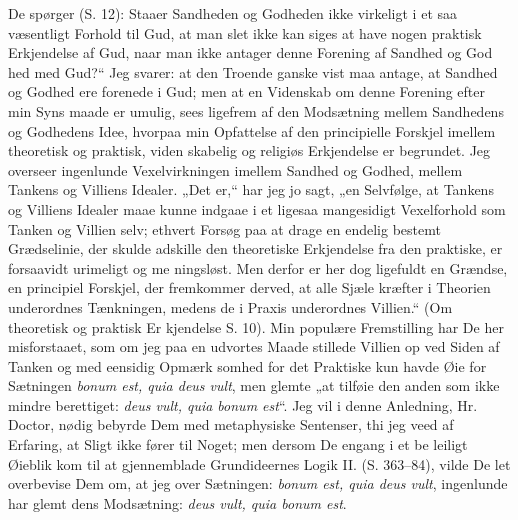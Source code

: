 \documentclass[12pt,a4paper]{article}
\newcommand{\opage}[1]{\marginnote{\footnotesize\textit{[#1]}}}
\begin{document}
\opage{13}\setcounter{footnote}{0}%
De spørger (S. 12): Staaer Sandheden og Godheden%
ikke virkeligt i et saa væsentligt Forhold til Gud, at man
slet ikke kan siges at have nogen praktisk Erkjendelse af Gud,
naar man ikke antager denne Forening af Sandhed og God\-%
hed med Gud?“ Jeg svarer: at den Troende ganske vist
maa antage, at Sandhed og Godhed ere forenede i Gud;
men at en Videnskab om denne Forening efter min Syns\-%
maade er umulig, sees ligefrem af den Modsætning mellem
Sandhedens og Godhedens Idee, hvorpaa min Opfattelse af
den principielle Forskjel imellem theoretisk og praktisk, viden\-%
skabelig og religiøs Erkjendelse er begrundet. Jeg overseer
ingenlunde Vexelvirkningen imellem Sandhed og Godhed,
mellem Tankens og Villiens Idealer. „Det er,“ har jeg jo
sagt, „en Selvfølge, at Tankens og Villiens Idealer maae
kunne indgaae i et ligesaa mangesidigt Vexelforhold som
Tanken og Villien selv; ethvert Forsøg paa at drage en
endelig bestemt Grædselinie, der skulde adskille den theoretiske%
Erkjendelse fra den praktiske, er forsaavidt urimeligt og me\-%
ningsløst. Men derfor er her dog ligefuldt en Grændse, en
principiel Forskjel, der fremkommer derved, at alle Sjæle\-%
kræfter i Theorien underordnes Tænkningen, medens de i
Praxis underordnes Villien.“ (Om theoretisk og praktisk Er\-%
kjendelse S. 10). Min populære Fremstilling har De her
misforstaaet, som om jeg paa en udvortes Maade stillede
Villien op ved Siden af Tanken og med eensidig Opmærk\-%
somhed for det Praktiske kun havde Øie for Sætningen \textit{bonum
est, quia deus vult}, men glemte „at tilføie den anden
som ikke mindre berettiget: \textit{deus vult, quia bonum est}“.
Jeg vil i denne Anledning, Hr. Doctor, nødig bebyrde Dem
med metaphysiske Sentenser, thi jeg veed af Erfaring, at
Sligt ikke fører til Noget; men dersom De engang i et be\-%
leiligt Øieblik kom til at gjennemblade Grundideernes Logik
II. (S. 363--84), vilde De let overbevise Dem om, at jeg
over Sætningen: \textit{bonum est, quia deus vult}, ingenlunde
har glemt dens Modsætning: \textit{deus vult, quia bonum est}.
\end{document}
